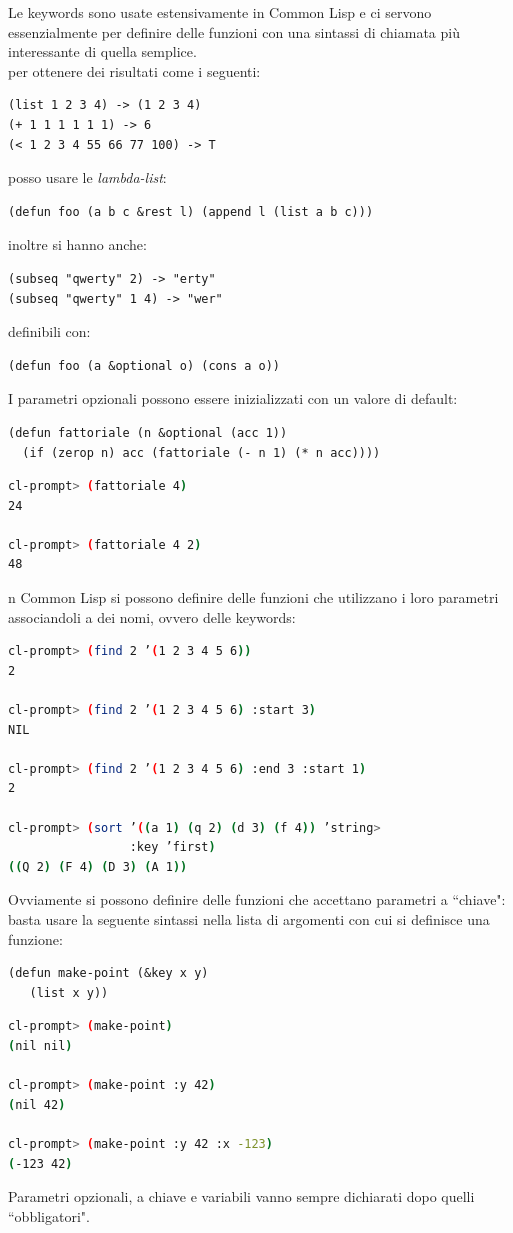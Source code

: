 \documentclass[a4paper,12pt, oneside]{book}
\begin{document}
Le keywords sono usate estensivamente in Common Lisp e ci
servono essenzialmente per definire delle funzioni con una
sintassi di chiamata più interessante di quella semplice.\\
per ottenere dei risultati come i seguenti:
\begin{verbatim}
(list 1 2 3 4) -> (1 2 3 4)
(+ 1 1 1 1 1 1) -> 6
(< 1 2 3 4 55 66 77 100) -> T
\end{verbatim}
posso usare le \textit{lambda-list}:
\begin{verbatim}
(defun foo (a b c &rest l) (append l (list a b c)))
\end{verbatim}
inoltre si hanno anche:
\begin{verbatim}
(subseq "qwerty" 2) -> "erty"
(subseq "qwerty" 1 4) -> "wer"
\end{verbatim}
definibili con:
\begin{verbatim}
(defun foo (a &optional o) (cons a o))
\end{verbatim}
I parametri opzionali possono essere inizializzati con un valore di default:
\begin{verbatim}
(defun fattoriale (n &optional (acc 1))
  (if (zerop n) acc (fattoriale (- n 1) (* n acc))))
\end{verbatim}
\begin{shaded}
\begin{lstlisting}[language=bash]
cl-prompt> (fattoriale 4)
24

cl-prompt> (fattoriale 4 2)
48
\end{lstlisting}
\end{shaded}
n Common Lisp si possono definire delle funzioni che utilizzano i loro parametri
associandoli a dei nomi, ovvero delle keywords:
\begin{shaded}
\begin{lstlisting}[language=bash]
cl-prompt> (find 2 ’(1 2 3 4 5 6))
2

cl-prompt> (find 2 ’(1 2 3 4 5 6) :start 3)
NIL

cl-prompt> (find 2 ’(1 2 3 4 5 6) :end 3 :start 1)
2

cl-prompt> (sort ’((a 1) (q 2) (d 3) (f 4)) ’string>
                 :key ’first)
((Q 2) (F 4) (D 3) (A 1))
\end{lstlisting}
\end{shaded}
Ovviamente si possono definire delle funzioni che accettano parametri a “chiave": basta usare la seguente
sintassi nella lista di argomenti con cui si definisce una funzione:
\begin{verbatim}
(defun make-point (&key x y)
   (list x y))
\end{verbatim}
\begin{shaded}
\begin{lstlisting}[language=bash]
cl-prompt> (make-point)
(nil nil)

cl-prompt> (make-point :y 42)
(nil 42)

cl-prompt> (make-point :y 42 :x -123)
(-123 42)
\end{lstlisting}
\end{shaded}
Parametri opzionali, a chiave e variabili vanno sempre dichiarati dopo quelli “obbligatori".\\
\end{document}
